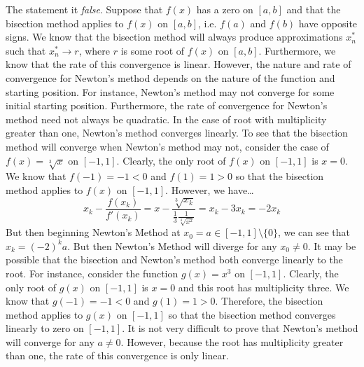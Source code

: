 \documentclass[11pt,letterpaper]{article}
\begin{document}
\sol The statement it \textit{false}. Suppose that $f(x)$ has a zero on $[a, b]$ and that the bisection method applies to $f(x)$ on $[a, b]$, i.e. $f(a)$ and $f(b)$ have opposite signs. We know that the bisection method will always produce approximations $x_n^*$ such that $x_n^* \to r$, where $r$ is some root of $f(x)$ on $[a, b]$. Furthermore, we know that the rate of this convergence is linear. However, the nature and rate of convergence for Newton's method depends on the nature of the function and starting position. For instance, Newton's method may not converge for some initial starting position. Furthermore, the rate of convergence for Newton's method need not always be quadratic. In the case of root with multiplicity greater than one, Newton's method converges linearly. To see that the bisection method will converge when Newton's method may not, consider the case of $f(x)= \sqrt[3]{x}$ on $[-1, 1]$. Clearly, the only root of $f(x)$ on $[-1, 1]$ is $x= 0$. We know that $f(-1)= -1 < 0$ and $f(1)= 1 > 0$ so that the bisection method applies to $f(x)$ on $[-1, 1]$. However, we have\dots
	\[
	x_k - \dfrac{f(x_k)}{f'(x_k)}= x - \dfrac{\sqrt[3]{x_k}}{\frac{1}{3} \frac{1}{\sqrt[3]{x^2}}}= x_k - 3x_k= -2x_k
	\]
But then beginning Newton's Method at $x_0= a \in [-1, 1] \setminus \{ 0 \}$, we can see that $x_k= (-2)^k a$. But then Newton's Method will diverge for any $x_0 \neq 0$. It may be possible that the bisection and Newton's method both converge linearly to the root. For instance, consider the function $g(x)= x^3$ on $[-1, 1]$. Clearly, the only root of $g(x)$ on $[-1, 1]$ is $x= 0$ and this root has multiplicity three. We know that $g(-1)= -1 < 0$ and $g(1)= 1 > 0$. Therefore, the bisection method applies to $g(x)$ on $[-1, 1]$ so that the bisection method converges linearly to zero on $[-1, 1]$. It is not very difficult to prove that Newton's method will converge for any $a \neq 0$. However, because the root has multiplicity greater than one, the rate of this convergence is only linear. 
\end{document}
